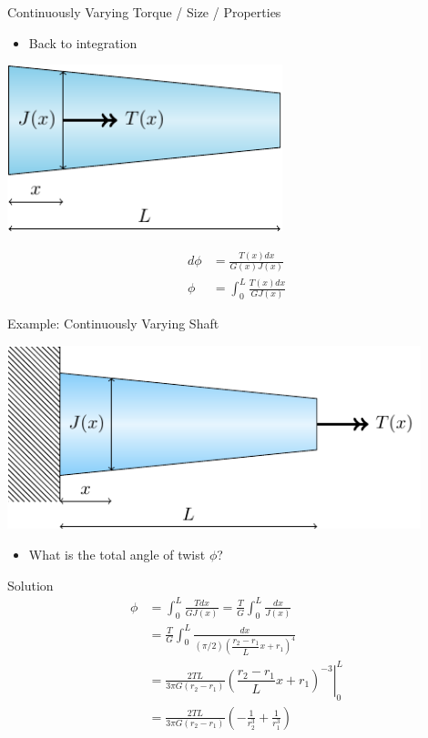 \documentclass[10pt, svgnames]{beamer}
\begin{document}
\begin{frame}[label={sec:org7cc25f9}]{Continuously Varying Torque / Size / Properties}
\begin{itemize}
\item Back to integration
\end{itemize}

\begin{center}
\includegraphics[width=0.6\textwidth]{pictures/cont-vary.pdf}
\end{center}

\begin{align*}
  d\phi &= \frac{T(x) dx}{G(x) J(x)} \\
  \phi  &= \int_0^L \frac{T(x)dx}{G{J(x)}}
\end{align*}
\end{frame}

\begin{frame}[label={sec:org76ec6ba}]{Example: Continuously Varying Shaft}
\begin{center}
\includegraphics[width=0.9\textwidth]{pictures/cont-vary-example.pdf}
\end{center}

\begin{itemize}
\item What is the total angle of twist \(\phi\)?
\end{itemize}
\end{frame}

\begin{frame}[label={sec:org5443d0e}]{Solution}
\begin{align*}
  \phi &= \int_{0}^{L} \frac{Tdx}{GJ(x)} = \frac{T}{G} \int_{0}^{L} \frac{dx}{J(x)} \\
       &= \frac{T}{G} \int_{0}^{L} \frac{dx}{(\pi/2) \left(\dfrac{r_{2} - r_{1}}{L}x + r_{1}\right)^{4}} \\
       &= \frac{2TL}{3\pi G (r_{2} - r_{1})} \left. \left(\dfrac{r_{2} - r_{1}}{L}x + r_{1}\right)^{-3}  \right|_{0}^{L} \\
       &= \frac{2TL}{3\pi G (r_{2} - r_{1})} \left( -\frac{1}{r_{2}^{3}} + \frac{1}{r_{1}^{3}} \right)
\end{align*}
\end{frame}
\end{document}
